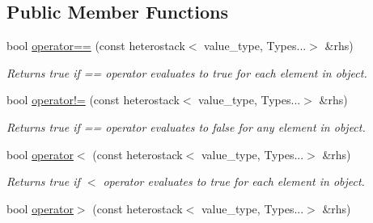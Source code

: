 \subsection*{Public Member Functions}
\begin{DoxyCompactItemize}
\item 
\hypertarget{classheterogeneous_1_1heterostack_3_01_t_00_01_types_8_8_8_4_aae9a3ff99e9c26e381e3f5cfb8c11a85}{}bool \hyperlink{classheterogeneous_1_1heterostack_3_01_t_00_01_types_8_8_8_4_aae9a3ff99e9c26e381e3f5cfb8c11a85}{operator==} (const heterostack$<$ value\+\_\+type, Types...$>$ \&rhs)\label{classheterogeneous_1_1heterostack_3_01_t_00_01_types_8_8_8_4_aae9a3ff99e9c26e381e3f5cfb8c11a85}

\begin{DoxyCompactList}\small\item\em Returns true if == operator evaluates to true for each element in object. \end{DoxyCompactList}\item 
\hypertarget{classheterogeneous_1_1heterostack_3_01_t_00_01_types_8_8_8_4_a49800ff99d455fb5dea959f0480439a3}{}bool \hyperlink{classheterogeneous_1_1heterostack_3_01_t_00_01_types_8_8_8_4_a49800ff99d455fb5dea959f0480439a3}{operator!=} (const heterostack$<$ value\+\_\+type, Types...$>$ \&rhs)\label{classheterogeneous_1_1heterostack_3_01_t_00_01_types_8_8_8_4_a49800ff99d455fb5dea959f0480439a3}

\begin{DoxyCompactList}\small\item\em Returns true if == operator evaluates to false for any element in object. \end{DoxyCompactList}\item 
\hypertarget{classheterogeneous_1_1heterostack_3_01_t_00_01_types_8_8_8_4_a89f5c6c59b9c0c1d3738174c8130a757}{}bool \hyperlink{classheterogeneous_1_1heterostack_3_01_t_00_01_types_8_8_8_4_a89f5c6c59b9c0c1d3738174c8130a757}{operator$<$} (const heterostack$<$ value\+\_\+type, Types...$>$ \&rhs)\label{classheterogeneous_1_1heterostack_3_01_t_00_01_types_8_8_8_4_a89f5c6c59b9c0c1d3738174c8130a757}

\begin{DoxyCompactList}\small\item\em Returns true if $<$ operator evaluates to true for each element in object. \end{DoxyCompactList}\item 
\hypertarget{classheterogeneous_1_1heterostack_3_01_t_00_01_types_8_8_8_4_a1c45ad94eeb4e1d58fe7a997aefe43c8}{}bool \hyperlink{classheterogeneous_1_1heterostack_3_01_t_00_01_types_8_8_8_4_a1c45ad94eeb4e1d58fe7a997aefe43c8}{operator$>$} (const heterostack$<$ value\+\_\+type, Types...$>$ \&rhs)\label{classheterogeneous_1_1heterostack_3_01_t_00_01_types_8_8_8_4_a1c45ad94eeb4e1d58fe7a997aefe43c8}


\end{DoxyCompactItemize}

